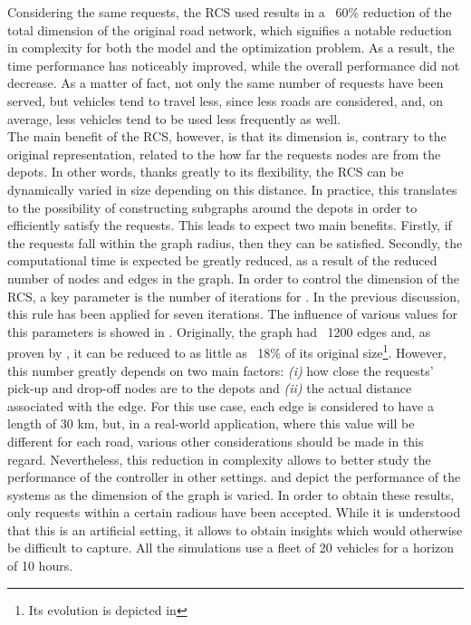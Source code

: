  Considering the same requests, the RCS used results in a ~60\% reduction of the total dimension of the original road network, which signifies a notable reduction in complexity for both the model and the optimization problem. As a result, the time performance has noticeably improved, while the overall performance did not decrease. As a matter of fact, not only the same number of requests have been served, but vehicles tend to travel less, since less roads are considered, and, on average, less vehicles tend to be used less frequently as well. \\
The main benefit of the RCS, however, is that its dimension is, contrary to the original representation, related to the how far the requests nodes are from the depots. In other words, thanks greatly to its flexibility, the RCS can be dynamically varied in size depending on this distance. In practice, this translates to the possibility of constructing subgraphs around the depots in order to efficiently satisfy the requests. This leads to expect two main benefits. Firstly, if the requests fall within the graph radius, then they can be satisfied. Secondly, the computational time is expected be greatly reduced, as a result of the reduced number of nodes and edges in the graph. In order to control the dimension of the RCS, a key parameter is the number of iterations for . In the previous discussion, this rule has been applied for seven iterations. The influence of various values for this parameters is showed in . Originally, the graph had ~1200 edges and, as proven by , it can be reduced to as little as ~18\% of its original size\footnote{Its evolution is depicted in }. However, this number greatly depends on two main factors: \textit{(i)} how close the requests' pick-up and drop-off nodes are to the depots and \textit{(ii)} the actual distance associated with the edge. For this use case, each edge is considered to have a length of 30 km, but, in a real-world application, where this value will be different for each road, various other considerations should be made in this regard. Nevertheless, this reduction in complexity allows to better study the performance of the controller in other settings.  and  depict the performance of the systems as the dimension of the graph is varied. In order to obtain these results, only requests within a certain radious have been accepted. While it is understood that this is an artificial setting, it allows to obtain insights which would otherwise be difficult to capture. All the simulations use a fleet of 20 vehicles for a horizon of 10 hours.\\
